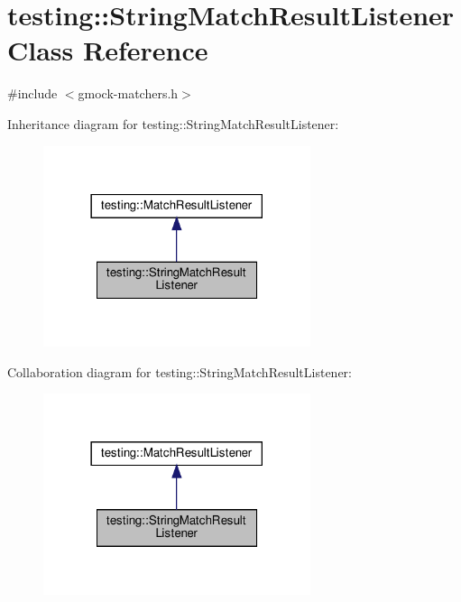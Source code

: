\hypertarget{classtesting_1_1_string_match_result_listener}{}\section{testing\+:\+:String\+Match\+Result\+Listener Class Reference}
\label{classtesting_1_1_string_match_result_listener}


{\ttfamily \#include $<$gmock-\/matchers.\+h$>$}



Inheritance diagram for testing\+:\+:String\+Match\+Result\+Listener\+:
\nopagebreak
\begin{figure}[H]
\begin{center}
\leavevmode
\includegraphics[width=222pt]{classtesting_1_1_string_match_result_listener__inherit__graph}
\end{center}
\end{figure}


Collaboration diagram for testing\+:\+:String\+Match\+Result\+Listener\+:
\nopagebreak
\begin{figure}[H]
\begin{center}
\leavevmode
\includegraphics[width=222pt]{classtesting_1_1_string_match_result_listener__coll__graph}
\end{center}
\end{figure}
